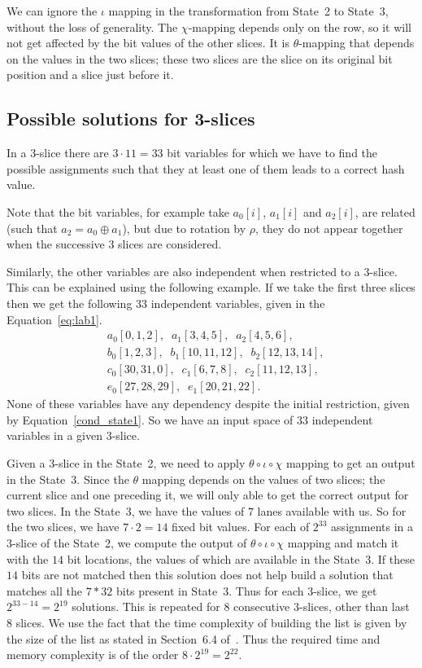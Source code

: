 We can ignore the $\iota$ mapping in the transformation from State~2 to State~3, without the loss of generality. The $\chi$-mapping depends only on the row, so it will not get affected by the bit values of the other slices. It is $\theta$-mapping that depends on the values in the two slices; these two slices are the slice on its original bit position and a slice just before it.

\subsection{Possible solutions for 3-slices} 
In a $3$-slice there are $3 \cdot 11 = 33$ bit variables for which we have to find the possible assignments such that they at least one of them leads to a correct hash value. 

Note that the bit variables, for example take $a_0[i]$, $a_1[i]$ and $a_2[i]$, are related (such that $a_2 = a_0 \oplus a_1$), but due to rotation by $\rho$, they do not appear together when the successive $3$ slices are considered.

Similarly, the other variables are also independent when restricted to a $3$-slice.
This can be explained using the following example. If we take the first three slices then we get the following $33$ independent variables, given in the Equation~\ref{eq:lab1}.
\begin{equation}
\label{eq:lab1}
\begin{aligned}
&a_0[0,1,2],\;\;a_1[3,4,5],\;\;a_2[4,5,6],\\
&b_0[1,2,3],\;\; b_1[10,11,12],\;\;b_2[12,13,14],\\
&c_0[30,31,0],\;\;c_1[6,7,8],\;\;c_2[11,12,13],\\
&e_0[27,28,29],\;\; e_1[20,21,22].
\end{aligned}
\end{equation}
None of these variables have any dependency despite the initial restriction, given by Equation~\ref{cond_state1}. So we have an input space of $33$ independent variables in a given $3$-slice. 

Given a $3$-slice in the State~2, we need to apply $\theta \circ \iota \circ \chi$ mapping to get an output in the State~3. Since the $\theta$ mapping depends on the values of two slices; the current slice and one preceding it, we will only able to get the correct output for two slices. In the State~3, we have the values of $7$ lanes available with us. So for the two slices, we have $7\cdot 2 = 14$ fixed bit values.
For each of $2^{33}$ assignments in a $3$-slice of the State~2, we compute the output of $\theta \circ \iota \circ \chi$ mapping and match it with the $14$ bit locations, the values of which are available in the State~3. If these $14$ bits are not matched then this solution does not help build a solution that matches all the $7*32$ bits present in State~3.
Thus for each $3$-slice, we get $2^{33-14} = 2^{19}$ solutions. This is repeated for $8$ consecutive $3$-slices, other than last $8$ slices. We use the fact that the time complexity of building the list is given by the size of the list as stated in Section~6.4 of~\cite{naya2011practical}. Thus the required time and memory complexity is of the order $8 \cdot 2^{19} = 2^{22}$.

